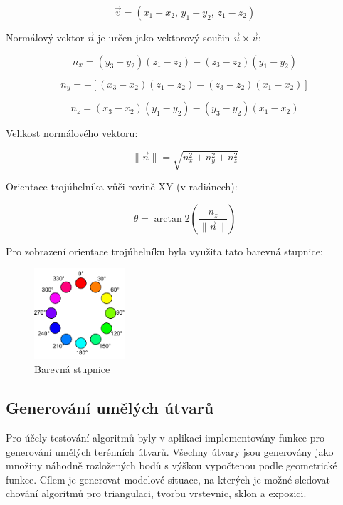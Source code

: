 \begin{equation}
\vec{v} = (x_1 - x_2,\, y_1 - y_2,\, z_1 - z_2)
\end{equation}

Normálový vektor $\vec{n}$ je určen jako vektorový součin $\vec{u} \times \vec{v}$:

\begin{equation}
n_x = (y_3 - y_2)(z_1 - z_2) - (z_3 - z_2)(y_1 - y_2)
\end{equation}

\begin{equation}
n_y = -\left[(x_3 - x_2)(z_1 - z_2) - (z_3 - z_2)(x_1 - x_2)\right]
\end{equation}

\begin{equation}
n_z = (x_3 - x_2)(y_1 - y_2) - (y_3 - y_2)(x_1 - x_2)
\end{equation}

Velikost normálového vektoru:

\begin{equation}
\|\vec{n}\| = \sqrt{n_x^2 + n_y^2 + n_z^2}
\end{equation}

Orientace trojúhelníka vůči rovině XY (v radiánech):

\begin{equation}
\theta = \arctan2\left( \frac{n_z}{\|\vec{n}\|} \right)
\end{equation}


Pro zobrazení orientace trojúhelníku byla využita tato barevná stupnice: \\
\begin{figure}[H]
  \centering
  \includegraphics[width=0.3\textwidth]{images/Colorwheel.png}
  \caption{Barevná stupnice}
\end{figure}


\subsection{Generování umělých útvarů}

Pro účely testování algoritmů byly v aplikaci implementovány funkce pro generování umělých terénních útvarů. Všechny útvary jsou generovány jako množiny náhodně rozložených bodů s výškou vypočtenou podle geometrické funkce. Cílem je generovat modelové situace, na kterých je možné sledovat chování algoritmů pro triangulaci, tvorbu vrstevnic, sklon a expozici.


